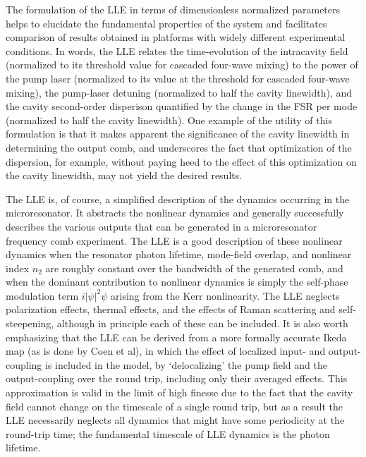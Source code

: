 The formulation of the LLE in terms of dimensionless normalized parameters helps to elucidate the fundamental properties of the system and facilitates comparison of results obtained in platforms with widely different experimental conditions. In words, the LLE relates the time-evolution of the intracavity field (normalized to its threshold value for cascaded four-wave mixing) to the power of the pump laser (normalized to its value at the threshold for cascaded four-wave mixing), the pump-laser detuning (normalized to half the cavity linewidth), and the cavity second-order disperison quantified by the change in the FSR per mode (normalized to half the cavity linewidth). One example of the utility of this formulation is that it makes apparent the significance of the cavity linewidth in determining the output comb, and underscores the fact that optimization of the dispersion, for example, without paying heed to the effect of this optimization on the cavity linewidth, may not yield the desired results.

The LLE is, of course, a simplified description of the dynamics occurring in the microresonator. It abstracts the nonlinear dynamics and generally successfully describes the various outputs that can be generated in a microresonator frequency comb experiment. The LLE is a good description of these nonlinear dynamics when the resonator photon lifetime, mode-field overlap, and nonlinear index $n_2$ are roughly constant over the bandwidth of the generated comb, and when the dominant contribution to nonlinear dynamics is simply the self-phase modulation term $i|\psi|^2\psi$ arising from the Kerr nonlinearity. The LLE neglects polarization effects, thermal effects, and the effects of Raman scattering and self-steepening, although in principle each of these can be included. It is also worth emphasizing that the LLE can be derived from a more formally accurate Ikeda map (as is done by Coen et al), in which the effect of localized input- and output-coupling is included in the model, by `delocalizing' the pump field and the output-coupling over the round trip, including only their averaged effects. This approximation is valid in the limit of high finesse due to the fact that the cavity field cannot change on the timescale of a single round trip, but as a result the LLE necessarily neglects all dynamics that might have some periodicity at the round-trip time; the fundamental timescale of LLE dynamics is the photon lifetime. 


%




